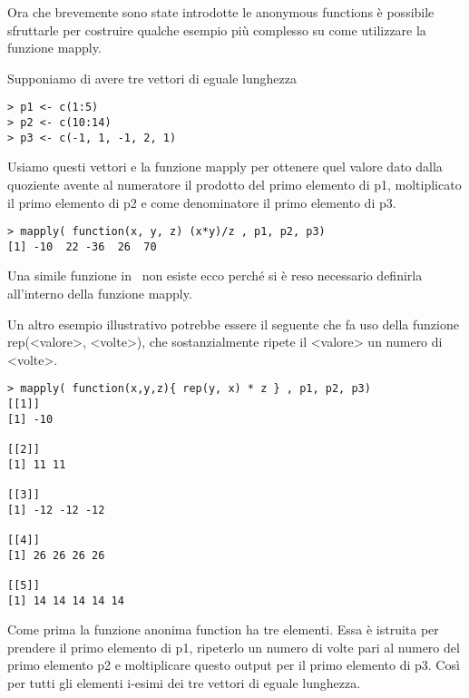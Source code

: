 Ora che brevemente sono state introdotte le anonymous functions è possibile sfruttarle per costruire qualche esempio più complesso su come utilizzare la funzione \textsf{mapply}.

Supponiamo di avere tre vettori di eguale lunghezza 
\begin{lstlisting}
> p1 <- c(1:5)
> p2 <- c(10:14)
> p3 <- c(-1, 1, -1, 2, 1)
\end{lstlisting}

Usiamo questi vettori e la funzione \textsf{mapply} per ottenere quel valore dato dalla quoziente avente al numeratore il prodotto del primo elemento di p1, moltiplicato il primo elemento di p2 e come denominatore il primo elemento di p3.

\begin{lstlisting}
> mapply( function(x, y, z) (x*y)/z , p1, p2, p3)
[1] -10  22 -36  26  70
\end{lstlisting}

Una simile funzione in \erre\ non esiste ecco perché si è reso necessario definirla all'interno della funzione \textsf{mapply}.

Un altro esempio illustrativo potrebbe essere il seguente che fa uso della funzione \textsf{rep(<valore>, <volte>)}, che sostanzialmente ripete il <valore> un numero di <volte>.
\begin{lstlisting}
> mapply( function(x,y,z){ rep(y, x) * z } , p1, p2, p3)
[[1]]
[1] -10

[[2]]
[1] 11 11

[[3]]
[1] -12 -12 -12

[[4]]
[1] 26 26 26 26

[[5]]
[1] 14 14 14 14 14
\end{lstlisting}

Come prima la funzione anonima function ha tre elementi. Essa è istruita per prendere il primo elemento di p1, ripeterlo un numero di volte pari al numero del primo elemento p2 e moltiplicare questo output per il primo elemento di p3. Così per tutti gli elementi i-esimi dei tre vettori di eguale lunghezza.

